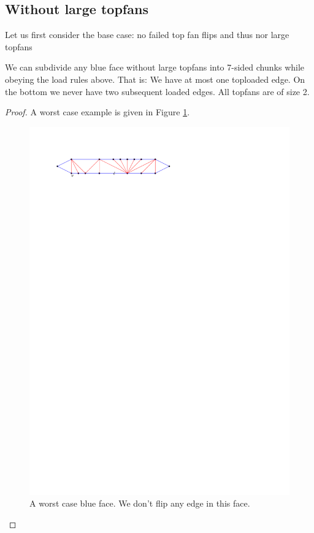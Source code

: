 \subsection{Without large topfans}
Let us first consider the base case: no failed top fan flips and thus nor large topfans

\begin{lemma}
  \label{lm:}
  We can subdivide any blue face without large topfans into 7-sided chunks while obeying the load rules above.
  That is: We have at most one toploaded edge. On the bottom we never have two subsequent loaded edges. All topfans are of size 2.
\end{lemma}

\begin{proof}
  A worst case example is given in Figure \ref{fig:subdiv:worstCase}.

  \begin{figure}[h]
    \centering
    \includegraphics[scale=1]{blueFaceSubdivision/img/worstCase}
    \caption{A worst case blue face. We don't flip any edge in this face.}
    \label{fig:subdiv:worstCase}
  \end{figure}


\end{proof}

